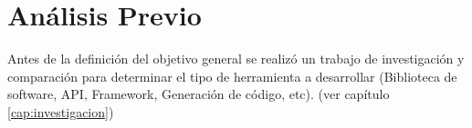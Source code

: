 \section{Análisis Previo}
Antes de la definición del objetivo general se realizó un trabajo de
investigación y comparación para determinar el tipo de herramienta a
desarrollar (Biblioteca de software, API, Framework, Generación de código,
etc). (ver capítulo \ref{cap:investigacion})